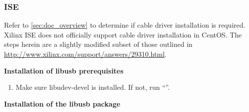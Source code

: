 \subsubsection{ISE}
\begin{flushleft}
Refer to \ref{sec:doc_overview} to determine if cable driver installation is required. Xilinx ISE does not officially support cable driver installation in CentOS. The steps herein are a slightly modified subset of those outlined in \url{http://www.xilinx.com/support/answers/29310.html}. \newline
\end{flushleft}
\textbf{Installation of libusb prerequisites}
\begin{enumerate}
\item Make sure libudev-devel is installed. If not, run ``''.
\end{enumerate}
\textbf{Installation of the libusb package}
